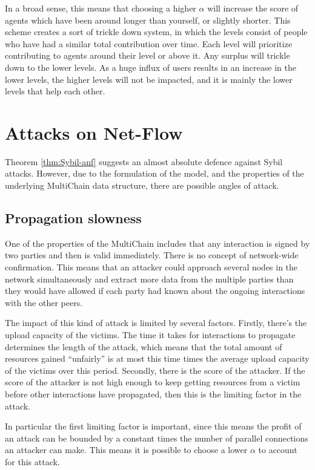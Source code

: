 \documentclass[a4paper,11pt]{book}
\theoremstyle{definition}
\begin{document}
In a broad sense, this means that choosing a higher $\alpha$ will increase the score 
of agents which have been around longer than yourself, or slightly shorter. This
scheme creates a sort of trickle down system, in which the levels consist of people
who have had a similar total contribution over time. Each level will prioritize
contributing to agents around their level or above it. Any surplus will trickle down
to the lower levels. As a huge influx of users results in an increase in the lower
levels, the higher levels will not be impacted, and it is mainly the
lower levels that help each other.


\section{Attacks on Net-Flow}
\label{sec:att_netflow}

Theorem \ref{thm:Sybil-anf} suggests an almost absolute defence against Sybil attacks. However,
due to the formulation of the model, and the properties of the underlying MultiChain data structure,
there are possible angles of attack.

\subsection{Propagation slowness}

One of the properties of the MultiChain includes that any interaction is signed by two parties and
then is valid immediately. There is no concept of network-wide confirmation. This means that an attacker
could approach several nodes in the network simultaneously and extract more data from the multiple parties
than they would have allowed if each party had known about the ongoing interactions with the other peers.

The impact of this kind of attack is limited by several factors. Firstly, there's the upload capacity of the
victims. The time it takes for interactions to propagate determines the length of the attack, which means that
the total amount of resources gained ``unfairly'' is at most this time times the average upload capacity of
the victims over this period. Secondly, there is the score of the attacker. If the score of the attacker is
not high enough to keep getting resources from a victim before other interactions have propagated, then this
is the limiting factor in the attack. 

In particular the first limiting factor is important, since this means the profit of an attack can be bounded
by a constant times the number of parallel connections an attacker can make. This means it is possible
to choose a lower $\alpha$ to account for this attack. 
\end{document}
